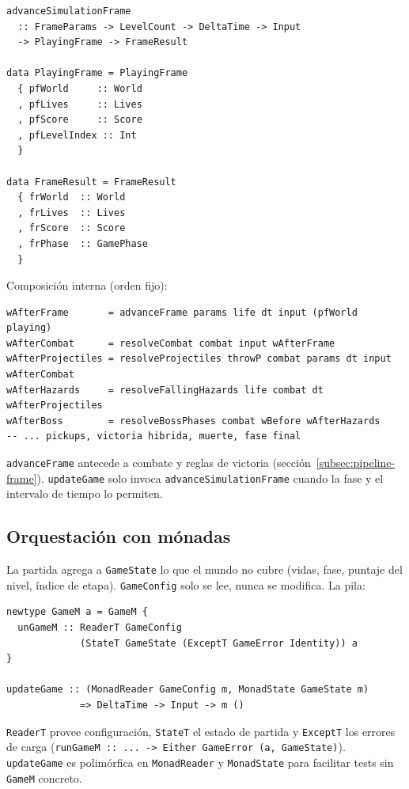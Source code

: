 \begin{lstlisting}
advanceSimulationFrame
  :: FrameParams -> LevelCount -> DeltaTime -> Input
  -> PlayingFrame -> FrameResult

data PlayingFrame = PlayingFrame
  { pfWorld     :: World
  , pfLives     :: Lives
  , pfScore     :: Score
  , pfLevelIndex :: Int
  }

data FrameResult = FrameResult
  { frWorld  :: World
  , frLives  :: Lives
  , frScore  :: Score
  , frPhase  :: GamePhase
  }
\end{lstlisting}

Composición interna (orden fijo):

\begin{lstlisting}
wAfterFrame       = advanceFrame params life dt input (pfWorld playing)
wAfterCombat      = resolveCombat combat input wAfterFrame
wAfterProjectiles = resolveProjectiles throwP combat params dt input wAfterCombat
wAfterHazards     = resolveFallingHazards life combat dt wAfterProjectiles
wAfterBoss        = resolveBossPhases combat wBefore wAfterHazards
-- ... pickups, victoria hibrida, muerte, fase final
\end{lstlisting}

\texttt{advanceFrame} antecede a combate y reglas de victoria
(sección~\ref{subsec:pipeline-frame}). \texttt{updateGame} solo invoca
\texttt{advanceSimulationFrame} cuando la fase y el intervalo de tiempo lo permiten.

\subsection{Orquestación con mónadas}
\label{subsec:solucion-monadas}

La partida agrega a \texttt{GameState} lo que el mundo no cubre (vidas, fase,
puntaje del nivel, índice de etapa). \texttt{GameConfig} solo se lee, nunca se modifica.
La pila:

\begin{lstlisting}
newtype GameM a = GameM {
  unGameM :: ReaderT GameConfig
             (StateT GameState (ExceptT GameError Identity)) a
}

updateGame :: (MonadReader GameConfig m, MonadState GameState m)
             => DeltaTime -> Input -> m ()
\end{lstlisting}

\texttt{ReaderT} provee configuración, \texttt{StateT} el estado de partida y
\texttt{ExceptT} los errores de carga
(\texttt{runGameM :: ... -> Either GameError (a, GameState)}).
\texttt{updateGame} es polimórfica en \texttt{MonadReader} y \texttt{MonadState} para
facilitar tests sin \texttt{GameM} concreto.

